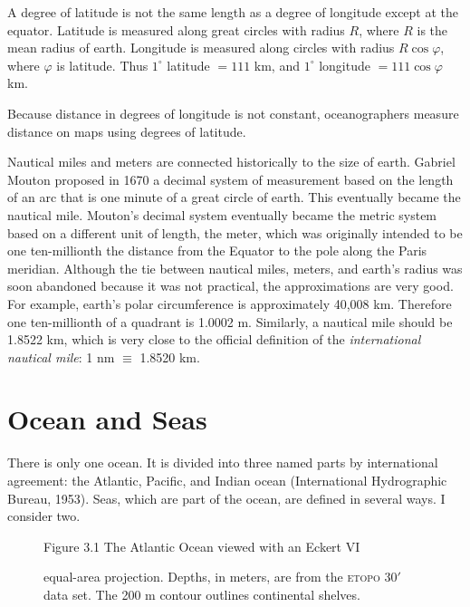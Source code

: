 A degree of latitude is not the same length as a degree of longitude
except at the equator. Latitude is measured along great circles with
radius $R$, where $R$ is the mean radius of earth. Longitude is
measured along circles with radius $R \cos \varphi$, where $\varphi$
is latitude. Thus $1^{\circ}$ latitude $ = 111$ km, and $1^{\circ}$
longitude $= 111 \cos \varphi$ km.

Because distance in degrees of longitude is not constant,
oceanographers measure distance on maps using degrees of latitude.

Nautical miles and meters are connected historically to the size of
earth. Gabriel Mouton proposed in 1670 a decimal system of measurement
based on the length of an arc that is one minute of a great circle of
earth.  This eventually became the nautical mile. Mouton's decimal
system eventually became the metric system based on a different unit
of length, the meter, which was originally intended to be one
ten-millionth the distance from the Equator to the pole along the
Paris meridian. Although the tie between nautical miles, meters, and
earth's radius was soon abandoned because it was not practical, the
approximations are very good. For example, earth's polar circumference
is approximately 40,008 km. Therefore one ten-millionth of a quadrant
is 1.0002 m. Similarly, a nautical mile should be 1.8522 km, which is
very close to the official definition of the
\textit{international nautical mile}: 1 nm $\equiv$ 1.8520 km.

\section{Ocean and Seas}
There is only one ocean. It is divided into three named parts by
international agreement: the Atlantic, Pacific, and Indian
ocean (International Hydrographic Bureau,
1953). Seas, which are part
of the ocean, are defined in several ways. I consider two.

\begin{figure}[t!]
 \footnotesize
\centering Figure 3.1 The Atlantic Ocean viewed with an Eckert
VI\rule{0mm}{3ex} equal-area projection. Depths, in meters, are
from the \textsc{etopo} 30$'$ data set. The 200 m contour outlines
continental shelves.

\label{fig:atlantic}
\vspace{-4ex}
\end{figure}

